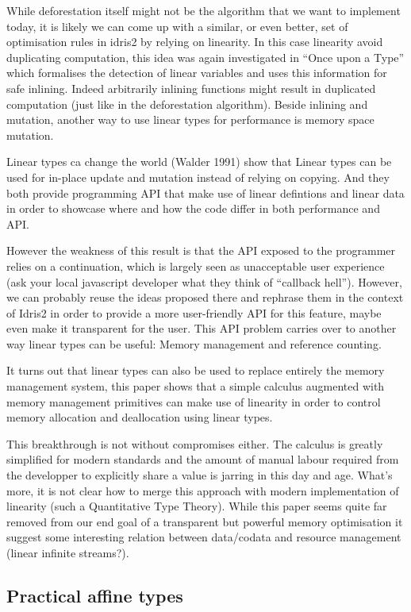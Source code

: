 \documentclass[
]{article}
\begin{document}
While deforestation itself might not be the algorithm that we want to
implement today, it is likely we can come up with a similar, or even
better, set of optimisation rules in idris2 by relying on linearity. In
this case linearity avoid duplicating computation, this idea was again
investigated in ``Once upon a Type'' which formalises the detection of
linear variables and uses this information for safe inlining. Indeed
arbitrarily inlining functions might result in duplicated computation
(just like in the deforestation algorithm). Beside inlining and
mutation, another way to use linear types for performance is memory
space mutation.

Linear types ca change the world (Walder 1991) show that Linear types
can be used for in-place update and mutation instead of relying on
copying. And they both provide programming API that make use of linear
defintions and linear data in order to showcase where and how the code
differ in both performance and API.

However the weakness of this result is that the API exposed to the
programmer relies on a continuation, which is largely seen as
unacceptable user experience (ask your local javascript developer what
they think of ``callback hell''). However, we can probably reuse the
ideas proposed there and rephrase them in the context of Idris2 in order
to provide a more user-friendly API for this feature, maybe even make it
transparent for the user. This API problem carries over to another way
linear types can be useful: Memory management and reference counting.

It turns out that linear types can also be used to replace entirely the
memory management system, this paper shows that a simple calculus
augmented with memory management primitives can make use of linearity in
order to control memory allocation and deallocation using linear types.

This breakthrough is not without compromises either. The calculus is
greatly simplified for modern standards and the amount of manual labour
required from the developper to explicitly share a value is jarring in
this day and age. What's more, it is not clear how to merge this
approach with modern implementation of linearity (such a Quantitative
Type Theory). While this paper seems quite far removed from our end goal
of a transparent but powerful memory optimisation it suggest some
interesting relation between data/codata and resource management (linear
infinite streams?).

\hypertarget{practical-affine-types}{%
\subsection{Practical affine types}\label{practical-affine-types}}
\end{document}
